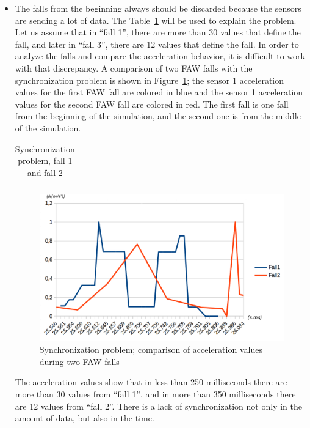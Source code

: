 \documentclass[review]{elsarticle}
\begin{document}
\begin{itemize}
 \item The falls from the beginning always should be discarded because the sensors are sending a lot of data. The Table~\ref{tabla:Synchro} will be used to explain the problem. Let us assume that in ``fall 1'', there are more than 30 values that define the fall, and later in ``fall 3'', there are 12 values that define the fall. In order to analyze the falls and compare the acceleration behavior, it is difficult to work with that discrepancy. A comparison of two FAW falls with the synchronization problem is shown in Figure~\ref{fig:synchronisation1}; the sensor 1 acceleration values for the first FAW fall are colored in blue and the sensor 1 acceleration values for the second FAW fall are colored in red. The first fall is one fall from the beginning of the simulation, and the second one is from the middle of the simulation. \newpage
 
 \begin{table}[!ht]
 \centering
 \begin{tabular}{*{5}{r}}
   
 \end{tabular}
 \caption{Synchronization problem, fall 1 and fall 2}%
 \label{tabla:Synchro}
 \end{table} 

 
 \begin{figure}[!ht]
  \centering
  \includegraphics[scale=0.25]{Images/synchronisation1.png}
  \caption[Comparison acceleration during two FAW falls]{Synchronization problem; comparison of acceleration values during two FAW falls}
  \label{fig:synchronisation1}
 \end{figure}
 The acceleration values show that in less than 250 milliseconds there are more than 30 values from ``fall 1'', and in more than 350 milliseconds there are 12 values from ``fall 2''. There is a lack of synchronization not only in the amount of data, but also in the time. 


\end{itemize}
\end{document}
